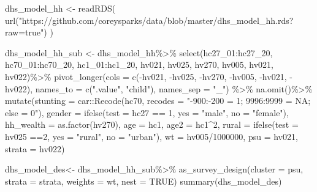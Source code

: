 \documentclass[
]{article}
\newenvironment{Shaded}{\begin{snugshade}}{\end{snugshade}}
\newcommand{\AttributeTok}[1]{\textcolor[rgb]{0.77,0.63,0.00}{#1}}
\newcommand{\ConstantTok}[1]{\textcolor[rgb]{0.00,0.00,0.00}{#1}}
\newcommand{\DecValTok}[1]{\textcolor[rgb]{0.00,0.00,0.81}{#1}}
\newcommand{\FunctionTok}[1]{\textcolor[rgb]{0.00,0.00,0.00}{#1}}
\newcommand{\NormalTok}[1]{#1}
\newcommand{\OtherTok}[1]{\textcolor[rgb]{0.56,0.35,0.01}{#1}}
\newcommand{\SpecialCharTok}[1]{\textcolor[rgb]{0.00,0.00,0.00}{#1}}
\newcommand{\StringTok}[1]{\textcolor[rgb]{0.31,0.60,0.02}{#1}}
\begin{document}
\begin{Shaded}
\begin{Highlighting}[]
\NormalTok{dhs\_model\_hh }\OtherTok{\textless{}{-}} \FunctionTok{readRDS}\NormalTok{(}
  \FunctionTok{url}\NormalTok{(}\StringTok{"https://github.com/coreysparks/data/blob/master/dhs\_model\_hh.rds?raw=true"}\NormalTok{)}
\NormalTok{  )}

\NormalTok{dhs\_model\_hh\_sub }\OtherTok{\textless{}{-}}\NormalTok{ dhs\_model\_hh}\SpecialCharTok{\%\textgreater{}\%}
  \FunctionTok{select}\NormalTok{(hc27\_01}\SpecialCharTok{:}\NormalTok{hc27\_20, }
\NormalTok{         hc70\_01}\SpecialCharTok{:}\NormalTok{hc70\_20, }
\NormalTok{         hc1\_01}\SpecialCharTok{:}\NormalTok{hc1\_20,}
\NormalTok{         hv021, hv025, hv270, hv005, hv021, hv022)}\SpecialCharTok{\%\textgreater{}\%}
  \FunctionTok{pivot\_longer}\NormalTok{(}\AttributeTok{cols =} \FunctionTok{c}\NormalTok{(}\SpecialCharTok{{-}}\NormalTok{hv021, }\SpecialCharTok{{-}}\NormalTok{hv025, }\SpecialCharTok{{-}}\NormalTok{hv270, }\SpecialCharTok{{-}}\NormalTok{hv005, }\SpecialCharTok{{-}}\NormalTok{hv021, }\SpecialCharTok{{-}}\NormalTok{hv022), }
               \AttributeTok{names\_to  =} \FunctionTok{c}\NormalTok{(}\StringTok{".value"}\NormalTok{, }\StringTok{"child"}\NormalTok{),}
               \AttributeTok{names\_sep =} \StringTok{"\_"}\NormalTok{) }\SpecialCharTok{\%\textgreater{}\%}
  \FunctionTok{na.omit}\NormalTok{()}\SpecialCharTok{\%\textgreater{}\%}
  \FunctionTok{mutate}\NormalTok{(}\AttributeTok{stunting =}\NormalTok{ car}\SpecialCharTok{::}\FunctionTok{Recode}\NormalTok{(hc70, }\AttributeTok{recodes =} \StringTok{"{-}900:{-}200 = 1; 9996:9999 = NA; else = 0"}\NormalTok{),}
         \AttributeTok{gender =} \FunctionTok{ifelse}\NormalTok{(}\AttributeTok{test =}\NormalTok{ hc27 }\SpecialCharTok{==} \DecValTok{1}\NormalTok{, }\AttributeTok{yes =} \StringTok{"male"}\NormalTok{, }\AttributeTok{no =} \StringTok{"female"}\NormalTok{),}
         \AttributeTok{hh\_wealth =} \FunctionTok{as.factor}\NormalTok{(hv270),}
         \AttributeTok{age =}\NormalTok{ hc1,}
         \AttributeTok{age2 =}\NormalTok{ hc1}\SpecialCharTok{\^{}}\DecValTok{2}\NormalTok{,}
         \AttributeTok{rural =} \FunctionTok{ifelse}\NormalTok{(}\AttributeTok{test =}\NormalTok{ hv025 }\SpecialCharTok{==}\DecValTok{2}\NormalTok{, }\AttributeTok{yes =} \StringTok{"rural"}\NormalTok{, }\AttributeTok{no =} \StringTok{"urban"}\NormalTok{),}
         \AttributeTok{wt =}\NormalTok{ hv005}\SpecialCharTok{/}\DecValTok{1000000}\NormalTok{,}
         \AttributeTok{psu =}\NormalTok{ hv021,}
         \AttributeTok{strata =}\NormalTok{ hv022)}


\NormalTok{dhs\_model\_des}\OtherTok{\textless{}{-}}\NormalTok{ dhs\_model\_hh\_sub}\SpecialCharTok{\%\textgreater{}\%}
  \FunctionTok{as\_survey\_design}\NormalTok{(}\AttributeTok{cluster =}\NormalTok{ psu,}
                   \AttributeTok{strata =}\NormalTok{ strata,}
                   \AttributeTok{weights =}\NormalTok{ wt,}
                   \AttributeTok{nest =} \ConstantTok{TRUE}\NormalTok{)}
\FunctionTok{summary}\NormalTok{(dhs\_model\_des)}
\end{Highlighting}
\end{Shaded}
\end{document}
